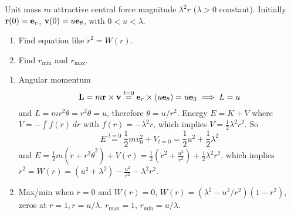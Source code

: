 \documentclass[10pt, a4paper]{article}
\begin{document}
\begin{problem}[2024 4.2.]
    Unit mass $m$ attractive central force magnitude $\lambda ^ 2r$
    ($\lambda > 0$ constant).
    Initially $\mathbf{r}(0) = \mathbf{e}_r$,
    $\mathbf{v}(0) = u\mathbf{e}_{\theta}$,
    with $0 < u < \lambda$.
    \begin{enumerate}[label = (\roman*)]
        \item Find equation like $\ddot{r} ^ 2 = W(r)$.

        \item Find $r_{\text{min}}$ and $r_{\text{max}}$.
    \end{enumerate}

    \begin{solution}
        \begin{enumerate}[label = (\roman*)]
            \item 
            Angular momentum
            \[
            \mathbf{L} = m\mathbf{r} \times \mathbf{v} \overset{t = 0}{=} \mathbf{e}_r \times (u\mathbf{e}_{\theta}) = u\mathbf{e}_3  \implies L = u
            \]
            and $L = mr ^ 2\dot{\theta} = r ^ 2\dot{\theta} = u$,
            therefore $\dot{\theta} = u / r ^ 2$.
            Energy $E = K + V$ where $V = -\int f(r)\,dr$ with $f(r) = -\lambda ^ 2r$,
            which implies $V = \frac{1}{2}\lambda ^ 2r ^ 2$.
            So
            \[
            E \overset{t = 0}{=} \frac{1}{2}mv_0 ^ 2 + V_{t = 0} = \frac{1}{2}u ^ 2 + \frac{1}{2}\lambda ^ 2
            \]
            and $E = \frac{1}{2}m(\dot{r} + r ^ 2\dot{\theta} ^ 2) + V(r) = \frac{1}{2}\left(\dot{r} ^ 2 + \frac{u ^ 2}{r ^ 2}\right) + \frac{1}{2}\lambda ^ 2r ^ 2$,
            which implies $\dot{r} ^ 2 = W(r) = (u ^ 2 + \lambda ^ 2) - \frac{u ^ 2}{r ^ 2} - \lambda ^ 2r ^ 2$.

            \item
            Max/min when $\dot{r} = 0$ and $W(r) = 0$,
            $W(r) = (\lambda ^ 2 - u ^ 2 / r ^ 2)(1 - r ^ 2)$,
            zeros at $r = 1, r = u / \lambda$.
            $r_{\text{max}} = 1$,
            $r_{\text{min}} = u / \lambda$.
        \end{enumerate}
    \end{solution}
\end{problem}
\end{document}

